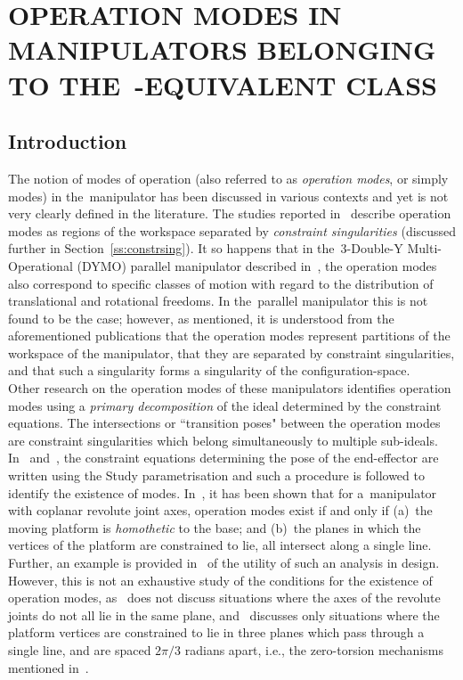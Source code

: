 \documentclass[DD]{iitmdiss}
\newcommand{\mref}[1]{\ref{#1}}
\newcommand{\mcite}[1]{\cite{#1}}
\newcommand{\mlabel}[1]{\label{#1}}
\begin{document}
\chapter{OPERATION MODES IN MANIPULATORS BELONGING TO THE~\rps-EQUIVALENT CLASS} \mlabel{ch:modes}
%
\section{Introduction}\mlabel{sc:modesintro}
%
The notion of modes of operation (also referred to as \emph{operation modes}, or simply modes) in the~\rps manipulator has been discussed in various contexts and yet is not very clearly defined in the literature. The studies reported in~\mcite{zlatanov2002a, zlatanov2002b} describe operation modes as regions of the workspace separated by \emph{constraint singularities} (discussed further in Section~\mref{ss:constrsing}). It so happens that in the~3-\dofs Double-Y Multi-Operational (DYMO) parallel manipulator described in~\mcite{zlatanov2002b}, the operation modes also correspond to specific classes of motion with regard to the distribution of translational and rotational freedoms. In the~\rps parallel manipulator this is not found to be the case; however, as mentioned, it is understood from the aforementioned publications that the operation modes represent partitions of the workspace of the manipulator, that they are separated by constraint singularities, and that such a singularity forms a singularity of the configuration-space. \\
Other research on the operation modes of these manipulators identifies operation modes using a \emph{primary decomposition} of the ideal determined by the constraint equations. The intersections or ``transition poses" between the operation modes are constraint singularities which belong simultaneously to multiple sub-ideals. In~\mcite{schadlbauer2014} and~\mcite{nayak2018a}, 
the constraint equations determining the pose of the end-effector are written using the Study parametrisation and such a procedure is followed to identify the existence of modes. In~\mcite{nayak2018a}, it has been shown that for a~\rps manipulator with coplanar revolute joint axes, operation modes exist if and only if (a)~the moving platform is \emph{homothetic} to the base; and (b)~the planes in which the vertices of the platform are constrained to lie, all intersect along a single line. Further, an example is provided in~\mcite{nayak2018b} of the utility of such an analysis in design. However, this is not an exhaustive study of the conditions for the existence of operation modes, as~\mcite{nayak2018a} does not discuss situations where the axes of the revolute joints do not all lie in the same plane, and~\mcite{nayak2018b} discusses only situations where the platform vertices are constrained to lie in three planes which pass through a single line, and are spaced $2\pi/3$ radians apart, i.e., the zero-torsion mechanisms mentioned in~\mcite{bonev2008}. \\
\end{document}
